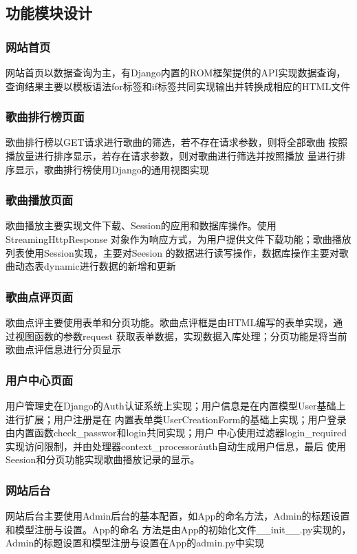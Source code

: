 \documentclass[UTF8,14pt]{article}
\numberwithin{figure}{subsubsection}
\numberwithin{table}{subsubsection}
\begin{document}
\subsection{功能模块设计}
\vspace*{-0.3cm}
\subsubsection{网站首页}
网站首页以数据查询为主，有Django内置的ROM框架提供的API实现数据查询，
查询结果主要以模板语法for标签和if标签共同实现输出并转换成相应的HTML文件
\vspace*{-0.3cm}
\subsubsection{歌曲排行榜页面}
歌曲排行榜以GET请求进行歌曲的筛选，若不存在请求参数，则将全部歌曲
按照播放量进行排序显示，若存在请求参数，则对歌曲进行筛选并按照播放
量进行排序显示，歌曲排行榜使用Django的通用视图实现
\vspace*{-0.3cm}
\subsubsection{歌曲播放页面}
歌曲播放主要实现文件下载、Session的应用和数据库操作。使用StreamingHttpResponse
对象作为响应方式，为用户提供文件下载功能；歌曲播放列表使用Session实现，主要对Seesion
的数据进行读写操作，数据库操作主要对歌曲动态表dynamic进行数据的新增和更新

\vspace*{-0.3cm}
\subsubsection{歌曲点评页面}
歌曲点评主要使用表单和分页功能。歌曲点评框是由HTML编写的表单实现，通过视图函数的参数request
获取表单数据，实现数据入库处理；分页功能是将当前歌曲点评信息进行分页显示
\vspace*{-0.3cm}
\subsubsection{用户中心页面}
用户管理史在Django的Auth认证系统上实现；用户信息是在内置模型User基础上进行扩展；用户注册是在
内置表单类UserCreationForm的基础上实现；用户登录由内置函数check\_passwor和login共同实现；用户
中心使用过滤器login\_required实现访问限制，并由处理器context\_processor\.auth自动生成用户信息，最后
使用Seesion和分页功能实现歌曲播放记录的显示。
\vspace*{-0.3cm}
\subsubsection{网站后台}
网站后台主要使用Admin后台的基本配置，如App的命名方法，Admin的标题设置和模型注册与设置。App的命名
方法是由App的初始化文件\_\_init\_\_.py实现的，Admin的标题设置和模型注册与设置在App的admin.py中实现
\end{document}
